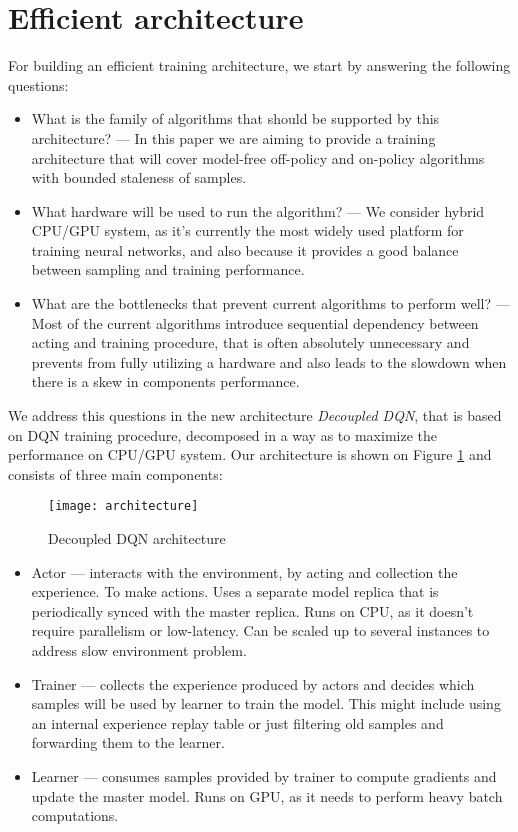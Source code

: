 \section{Efficient architecture}

For building an efficient training architecture, we start by answering the following questions:

\begin{itemize}
    \item What is the family of algorithms that should be supported by this architecture? --- In
    this paper we are aiming to provide a training architecture that will cover model-free
    off-policy and on-policy algorithms with bounded staleness of samples.

    \item What hardware will be used to run the algorithm? --- We consider hybrid CPU/GPU system,
    as it's currently the most widely used platform for training neural networks, and also because
    it provides a good balance between sampling and training performance.

    \item What are the bottlenecks that prevent current algorithms to perform well? --- Most of the
    current algorithms introduce sequential dependency between acting and training procedure, that
    is often absolutely unnecessary and prevents from fully utilizing a hardware and also leads to the
    slowdown when there is a skew in components performance.
\end{itemize}

We address this questions in the new architecture \emph{Decoupled DQN}, that is based on DQN
training procedure, decomposed in a way as to maximize the performance on CPU/GPU system.
Our architecture is shown on Figure \ref{fig:architecture} and consists of three main components:

\begin{figure}[t]
\caption{Decoupled DQN architecture}
\texttt{[image: architecture]}
\label{fig:architecture}
\end{figure}

\begin{itemize}
    \item Actor --- interacts with the environment, by acting and collection the experience. To
        make actions. Uses a separate model replica that is periodically synced with the master replica.
        Runs on CPU, as it doesn't require parallelism or low-latency. Can be scaled up to several
        instances to address slow environment problem.

    \item Trainer --- collects the experience produced by actors and decides which samples will be
        used by learner to train the model. This might include using an internal experience replay
        table or just filtering old samples and forwarding them to the learner.

    \item Learner --- consumes samples provided by trainer to compute gradients and update the
        master model. Runs on GPU, as it needs to perform heavy batch computations.
\end{itemize}

